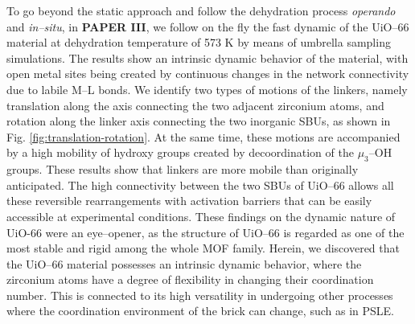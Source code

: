 \npar
To go beyond the static approach and follow the dehydration process \textit{operando} and \textit{in--situ}, in \textbf{PAPER III}, we follow on the fly the fast dynamic of the UiO--66 material at dehydration temperature of 573 K by means of umbrella sampling simulations. The results show an intrinsic dynamic behavior of the material, with open metal sites being created by continuous changes in the network connectivity due to labile M--L bonds. We identify two types of motions of the linkers, namely translation along the axis connecting the two adjacent zirconium atoms, and rotation along the linker axis connecting the two inorganic SBUs, as shown in Fig. \ref{fig:translation-rotation}. At the same time, these motions are accompanied by a high mobility of hydroxy groups created by decoordination of the $\mu_3$--OH groups. These results show that linkers are more mobile than originally anticipated. The high connectivity between the two SBUs of UiO--66 allows all these reversible rearrangements with activation barriers that can be easily accessible at experimental conditions. 
\npar
These findings on the dynamic nature of UiO-66 were an eye--opener, as the structure of UiO--66 is regarded as one of the most stable and rigid among the whole MOF family. Herein, we discovered that the UiO--66 material possesses an intrinsic dynamic behavior, where the zirconium atoms have a degree of flexibility in changing their coordination number. This is connected to its high versatility in undergoing other processes where the coordination environment of the brick can change, such as in PSLE.


